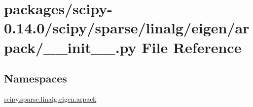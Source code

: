 \hypertarget{packages_2scipy-0_814_80_2scipy_2sparse_2linalg_2eigen_2arpack_2____init_____8py}{}\section{packages/scipy-\/0.14.0/scipy/sparse/linalg/eigen/arpack/\+\_\+\+\_\+init\+\_\+\+\_\+.py File Reference}
\label{packages_2scipy-0_814_80_2scipy_2sparse_2linalg_2eigen_2arpack_2____init_____8py}
\subsection*{Namespaces}
\begin{DoxyCompactItemize}
\item 
 \hyperlink{namespacescipy_1_1sparse_1_1linalg_1_1eigen_1_1arpack}{scipy.\+sparse.\+linalg.\+eigen.\+arpack}
\end{DoxyCompactItemize}
